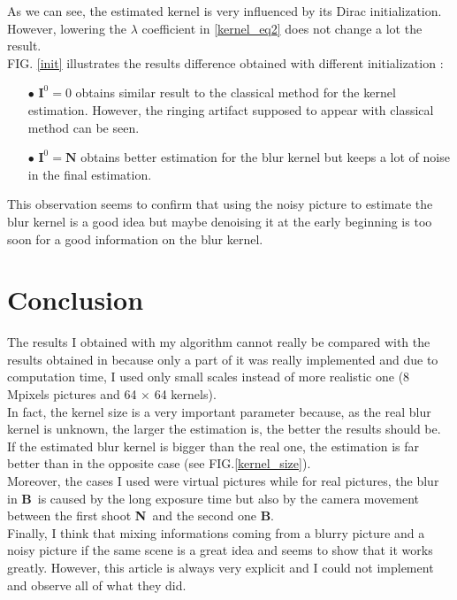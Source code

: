 \documentclass{article}
\newcommand{\I}{\textbf{I}}
\newcommand{\B}{\textbf{B}}
\newcommand{\N}{\textbf{N}}
\begin{document}
As we can see, the estimated kernel is very influenced by its Dirac initialization. However, lowering the $\lambda$ coefficient in \eqref{kernel_eq2} does not change a lot the result.\\

FIG. \ref{init} illustrates the results difference obtained with different initialization :

\begin{itemize}
	\item[$\bullet$] $\I^0 = 0$ obtains similar result to the classical method for the kernel estimation. However, the ringing artifact supposed to appear with classical method can be seen.
	\item[$\bullet$] $\I^0 = \N$ obtains better estimation for the blur kernel but keeps a lot of noise in the final estimation.
\end{itemize}

This observation seems to confirm that using the noisy picture to estimate the blur kernel is a good idea but maybe denoising it at the early beginning is too soon for a good information on the blur kernel.

\newpage

\section{Conclusion}

The results I obtained with my algorithm cannot really be compared with the results obtained in \cite{deblur_denoise} because only a part of it was really implemented and due to computation time, I used only small scales instead of more realistic one (8 Mpixels pictures and 64 $\times$ 64 kernels).\\
In fact, the kernel size is a very important parameter because, as the real blur kernel is unknown, the larger the estimation is, the better the results should be. If the estimated blur kernel is bigger than the real one, the estimation is far better than in the opposite case (see FIG.\ref{kernel_size}). \\
Moreover, the cases I used were virtual pictures while for real pictures, the blur in \B\ is caused by the long exposure time but also by the camera movement between the first shoot \N\ and the second one \B.\\
Finally, I think that mixing informations coming from a blurry picture and a noisy picture if the same scene is a great idea and \cite{deblur_denoise} seems to show that it works greatly. However, this article is always very explicit and I could not implement and observe all of what they did.
\end{document}
